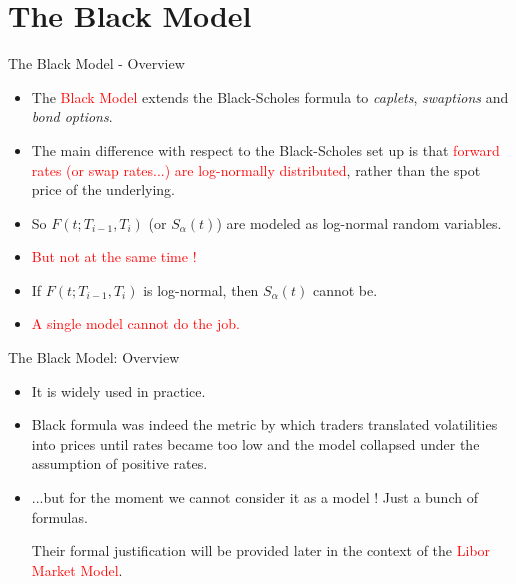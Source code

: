 \documentclass{beamer}
\begin{document}
\section{The Black Model}
\begin{frame}{The Black Model - Overview}
	\begin{itemize}
		\item The \textcolor{red}{Black Model} extends the Black-Scholes formula to \emph{caplets}, \emph{swaptions} and \emph{bond options}. %
		\item The main difference with respect to the Black-Scholes set up is that \textcolor{red}{forward rates (or swap rates...) are log-normally distributed}, rather than the spot price of the underlying.
		\item So $F(t;T_{i-1},T_i)$ (or $S_\alpha(t)$) are modeled as log-normal random variables. 
		\item\textcolor{red}{But not at the same time !} 
		\item If $F(t;T_{i-1},T_i)$ is log-normal, then $S_\alpha(t)$ cannot be.
		\item \textcolor{red}{A single model cannot do the job.}
	\end{itemize}
\end{frame}


\begin{frame}{The Black Model: Overview}
	\begin{itemize}
		\item It is widely used in practice. 
		\item Black formula was indeed the metric by which traders translated volatilities into prices until rates became too low and the model collapsed under the assumption of positive rates.
		\item ...but for the moment we cannot consider it as a model ! Just a bunch of formulas.
		
		Their formal justification will be provided later in the context of the \textcolor{red}{Libor Market Model}.
	\end{itemize}
\end{frame}
\end{document}
